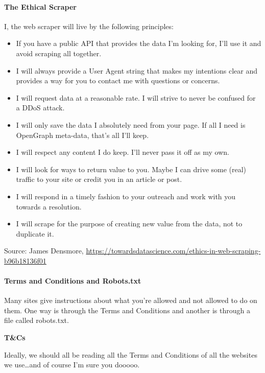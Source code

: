 \documentclass[
  openany]{book}
\providecommand{\tightlist}{%
  \setlength{\itemsep}{0pt}\setlength{\parskip}{0pt}}
\begin{document}
\hypertarget{the-ethical-scraper}{%
\paragraph{The Ethical Scraper}\label{the-ethical-scraper}}

I, the web scraper will live by the following principles:

\begin{itemize}
\tightlist
\item
  If you have a public API that provides the data I'm looking for, I'll use it and avoid scraping all together.
\item
  I will always provide a User Agent string that makes my intentions clear and provides a way for you to contact me with questions or concerns.
\item
  I will request data at a reasonable rate. I will strive to never be confused for a DDoS attack.
\item
  I will only save the data I absolutely need from your page. If all I need is OpenGraph meta-data, that's all I'll keep.
\item
  I will respect any content I do keep. I'll never pass it off as my own.
\item
  I will look for ways to return value to you. Maybe I can drive some (real) traffic to your site or credit you in an article or post.
\item
  I will respond in a timely fashion to your outreach and work with you towards a resolution.
\item
  I will scrape for the purpose of creating new value from the data, not to duplicate it.
\end{itemize}

Source: James Densmore, \url{https://towardsdatascience.com/ethics-in-web-scraping-b96b18136f01}

\hypertarget{terms-and-conditions-and-robots.txt}{%
\paragraph{Terms and Conditions and Robots.txt}\label{terms-and-conditions-and-robots.txt}}

Many sites give instructions about what you're allowed and not allowed to do on them.
One way is through the Terms and Conditions and another is through a file called robots.txt.

\textbf{T\&Cs}

Ideally, we should all be reading all the Terms and Conditions of all the websites we use\ldots and of course I'm sure you dooooo.
\end{document}
